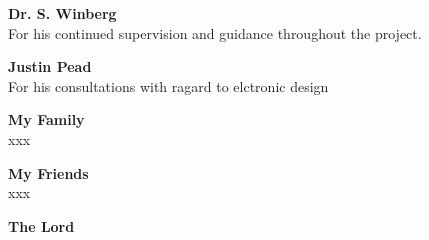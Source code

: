 \textbf{Dr. S. Winberg}\\
For his continued supervision and guidance throughout the project.

\textbf{Justin Pead}\\
For his consultations with ragard to elctronic design

\textbf{My Family}\\
xxx

\textbf{My Friends}\\
xxx

\textbf{The Lord}\\

